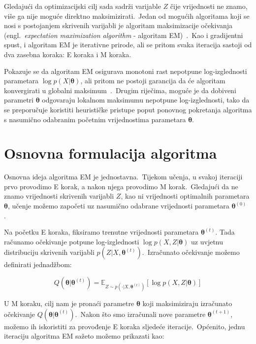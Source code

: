 \documentclass[diplomskirad]{fer}
\begin{document}
Gledajući da optimizacijski cilj sada sadrži varijable $Z$ čije vrijednosti ne znamo, više ga nije moguće direktno maksimizirati.\ 
Jedan od mogućih algoritama koji se nosi s postojanjem skrivenih varijabli je algoritam maksimizacije očekivanja (engl.\ \textit{expectation maximization algorithm} - algoritam EM)~\cite{moon1996expectation}.\ 
Kao i gradijentni spust, i algoritam EM je iterativne prirode, ali se pritom svaka iteracija sastoji od dva zasebna koraka: E koraka i M koraka.\ 
  
Pokazuje se da algoritam EM osigurava monotoni rast nepotpune log-izglednosti parametara $\log p(X | \bm{\theta})$, ali pritom ne postoji garancija da će algoritam konvergirati u globalni maksimum~\cite{wu1983convergence}.\
Drugim riječima, moguće je da dobiveni parametri $\bm{\theta}$ odgovaraju lokalnom maksimumu nepotpune log-izglednosti, tako da se preporučuje koristiti heurističke pristupe poput ponovnog pokretanja algoritma s nasumično odabranim početnim vrijednostima parametara $\bm{\theta}$.\ 

\section{Osnovna formulacija algoritma}
\label{sek:basic_em}

Osnovna ideja algoritma EM je jednostavna.\ Tijekom učenja, u svakoj iteraciji prvo provodimo E korak, a nakon njega provodimo M korak.\ 
Gledajući da ne znamo vrijednosti skrivenih varijabli $Z$, kao ni vrijednosti optimalnih parametara $\bm{\theta}$, učenje možemo započeti uz nasumično odabrane vrijednosti parametara $\bm{\theta}^{(0)}$.\ 
  
Na početku E koraka, fiksiramo trenutne vrijednosti parametara $\bm{\theta}^{(t)}$. Tada računamo očekivanje potpune log-izglednosti $\log p(X, Z | \bm{\theta})$ uz uvjetnu distribuciju skrivenih varijabli $p(Z | X, \bm{\theta}^{(t)})$.\ 
Izračunato očekivanje možemo definirati jednadžbom:

\begin{equation}
  Q (\bm{\theta} | \bm{\theta}^{(t)}) = \mathbb{E}_{Z \sim p(\cdot | X, \bm{\theta}^{(t)})} \left[ \log p(X, Z | \bm{\theta}) \right]
  \label{eq:em_e_step_basic}
\end{equation}

U M koraku, cilj nam je pronaći parametre $\bm{\theta}$ koji maksimiziraju izračunato očekivanje $Q (\bm{\theta} | \bm{\theta}^{(t)})$.\
Nakon što smo izračunali nove parametre $\bm{\theta}^{(t + 1)}$, možemo ih iskoristiti za provođenje E koraka sljedeće iteracije.\ 
Općenito, jednu iteraciju algoritma EM sažeto možemo prikazati kao:
\end{document}
